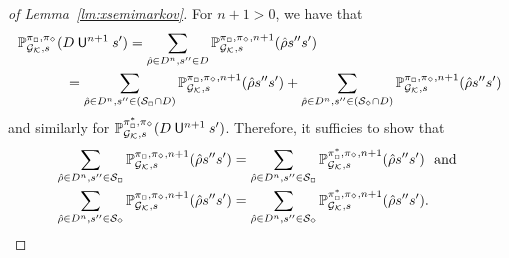 \begin{proof}[of Lemma~\ref{lm:xsemimarkov}]
  For $n+1>0$, we have that
  \begin{align*}
    \Prob^{\strat_{\maxplay},\strat_{\minplay}}_{\StochGK,s}(D \Until^{n+1} s')
    =
    \sum_{\hat{\rho}\in D^n,s''\in D}\Prob^{\strat_{\maxplay},\strat_{\minplay},n+1}_{\StochGK,s}(\hat{\rho}s''s')
    \hspace{-18em} &
    \\
    & =
    \sum_{\hat{\rho}\in D^n,s''\in(\sgnmax\cap D)}\Prob^{\strat_{\maxplay},\strat_{\minplay},n+1}_{\StochGK,s}(\hat{\rho}s''s') +
    \sum_{\hat{\rho}\in D^n,s''\in(\sgnmin\cap D)}\Prob^{\strat_{\maxplay},\strat_{\minplay},n+1}_{\StochGK,s}(\hat{\rho}s''s')
  \end{align*}
  and similarly for
  $\mathbb{P}^{\pi^*_{{\Box}},\pi_{{\Diamond}}}_{{\mathcal{G}_{\mathcal{K}}},s}(D \mathbin{\mathsf{U}}^{n+1} s')$.
  Therefore, it sufficies to show that
  \begin{align}
    \sum_{\hat{\rho}\in D^n,s''\in\mathcal{S}_{\Box}}\mathbb{P}^{\pi_{{\Box}},\pi_{{\Diamond}},n+1}_{{\mathcal{G}_{\mathcal{K}}},s}(\hat{\rho}s''s')
    & =
    \sum_{\hat{\rho}\in D^n,s''\in\mathcal{S}_{\Box}}\mathbb{P}^{\pi^*_{{\Box}},\pi_{{\Diamond}},n+1}_{{\mathcal{G}_{\mathcal{K}}},s}(\hat{\rho}s''s') \text{ \ and }
    \label{lm:xsemimarkov:i:obligation:i}\\
    \sum_{\hat{\rho}\in D^n,s''\in\mathcal{S}_{\Diamond}}\mathbb{P}^{\pi_{{\Box}},\pi_{{\Diamond}},n+1}_{{\mathcal{G}_{\mathcal{K}}},s}(\hat{\rho}s''s')
    & =
    \sum_{\hat{\rho}\in D^n,s''\in\mathcal{S}_{\Diamond}}\mathbb{P}^{\pi^*_{{\Box}},\pi_{{\Diamond}},n+1}_{{\mathcal{G}_{\mathcal{K}}},s}(\hat{\rho}s''s').
    \label{lm:xsemimarkov:i:obligation:ii}
  \end{align}


\end{proof}
